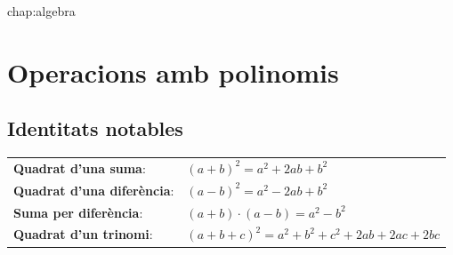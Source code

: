 {chap:algebra}
 

\section{Operacions amb polinomis}
\vspace{-0.35cm}
\subsection{Identitats notables}
\vspace{-0.35cm}
\begin{theorybox}
	\begin{tabular}{ll}
	    \textbf{Quadrat d'una suma}: & $(a+b)^2 = a^2 + 2 ab+b^2$ \\
		\textbf{Quadrat d'una diferència}: & $(a-b)^2 = a^2 - 2 ab+b^2$\\
		\textbf{Suma per diferència}: & $(a+b)\cdot(a-b) = a^2 - b^2$ \\ [0.8ex]  
		\textbf{Quadrat d'un trinomi}: & $(a+b+c)^2 = a^2+b^2+c^2+2ab+2ac+2bc$		
	\end{tabular}
\end{theorybox}

